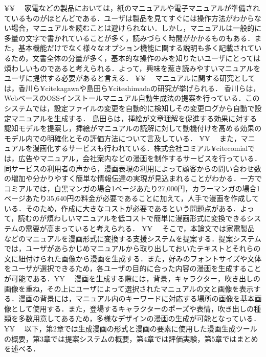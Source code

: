 ¥¥
　家電などの製品においては，紙のマニュアルや電子マニュアルが準備されているものがほとんどである．ユーザは製品を見てすぐには操作方法がわからない場合，マニュアルを読むことは避けられない．しかし，マニュアルは一般的に多量の文字で書かれていることが多く，読みづらく時間がかかるものもある．また，基本機能だけでなく様々なオプション機能に関する説明も多く記載されているため，文書全体の分量が多く，基本的な操作のみを知りたいユーザにとっては煩わしいものであると考えられる．よって，興味を惹き読みやすいマニュアルをユーザに提供する必要があると言える．
¥¥
　マニュアルに関する研究としては，香川ら¥cite{kagawa}や島田ら¥cite{shimada}の研究が挙げられる．
香川らは，WebベースのOSSインストールマニュアル自動生成法の提案を行っている．このシステムでは，設定ファイルの変更を自動的に検知しその変更ログから自動で設定マニュアルを生成する．
島田らは，挿絵が文章理解を促進する効果に対する認知モデルを提案し，挿絵がマニュアルの読解に対して動機付けを高める効果のモデル内での明確化とその評価方法について言及している．
¥¥
　また，マニュアルを漫画化するサービスも行われている．株式会社コミアル¥cite{comial}では，広告やマニュアル，会社案内などの漫画を制作するサービスを行っている．同サービスの利用者の声から，漫画表現の利用によって顧客からの問い合わせ数の増加や分かりやすく簡単な情報伝達の実現が見込まれることがわかる．一方でコミアルでは，白黒マンガの場合1ページあたり27,000円，カラーマンガの場合1ページあたり35,640円の料金が必要であることに加えて，人手で漫画を作成している．そのため，作成に大きなコストが必要であるという問題点がある．よって，読むのが煩わしいマニュアルを低コストで簡単に漫画形式に変換できるシステムの需要が高まっていると考えられる．
¥¥
　そこで，本論文では家電製品などのマニュアルを漫画形式に変換する支援システムを提案する．提案システムでは，ユーザがあらかじめマニュアルから取り出しておいたテキストとそれらの文に紐付けられた画像から漫画を生成する．また，好みのフォントサイズや文体をユーザが選択できるため，各ユーザの目的に合った内容の漫画を生成することが可能である．¥¥
　漫画を生成する際には，背景，キャラクター，吹き出しの画像を重ね，その上にユーザによって選択されたマニュアルの文と画像を表示する．漫画の背景には，マニュアル内のキーワードに対応する場所の画像を基本画像として使用する．また，登場するキャラクターのポーズや表情，吹き出しの種類を多数用意してあるため，多様なデザインの漫画の生成が可能となっている．
¥¥
　以下，第2章では生成漫画の形式と漫画の要素に使用した漫画生成ツールの概要，第3章では提案システムの概要，第4章では評価実験，第5章ではまとめを述べる．
